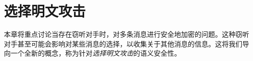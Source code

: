 \chapter{选择明文攻击}\label{chap:5}

本章将重点讨论当存在窃听对手时，对多条消息进行安全地加密的问题。这种窃听对手甚至可能会影响对某些消息的选择，以收集关于其他消息的信息。这将我们导向一个全新的概念，称为针对\emph{选择明文攻击}的语义安全性。








